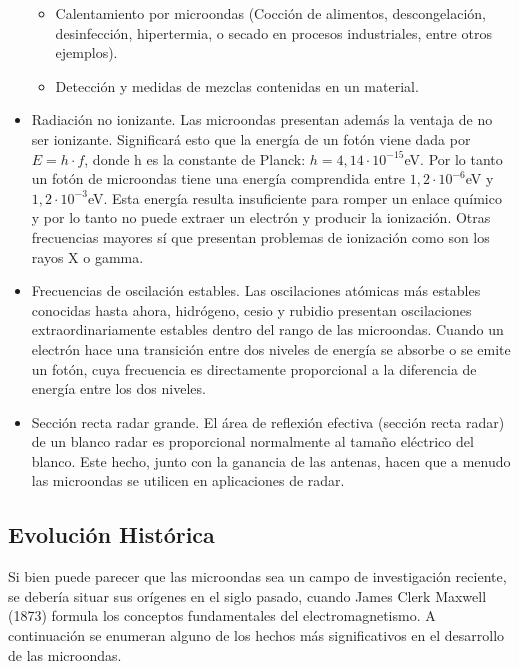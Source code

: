 \documentclass[12pt]{article}
\begin{document}
\begin{itemize}
		\begin{itemize}
			\item Calentamiento por microondas (Cocci\'on de alimentos, descongelaci\'on, desinfecci\'on, hipertermia, o secado en procesos industriales, entre otros ejemplos).
			\item Detecci\'on y medidas de mezclas contenidas en un material.
		\end{itemize}
	\item Radiaci\'on no ionizante. Las microondas presentan adem\'as la ventaja de no ser ionizante. Significar\'a esto que la energ\'ia de un fot\'on viene dada por $E=h\cdot f$, donde h es la constante de Planck: $h= 4,14\cdot 10^{-15}$eV. Por lo tanto un fot\'on de microondas tiene una energ\'ia comprendida entre $1,2\cdot 10^{-6}$eV y $1,2\cdot 10^{-3}$eV. Esta energ\'ia resulta insuficiente para romper un enlace qu\'imico y por lo tanto no puede extraer un electr\'on y producir la ionizaci\'on. Otras frecuencias mayores s\'i que presentan problemas de ionizaci\'on como son los rayos X o gamma.
	\item Frecuencias de oscilaci\'on estables. Las oscilaciones at\'omicas m\'as estables conocidas hasta ahora, hidr\'ogeno, cesio y rubidio presentan oscilaciones extraordinariamente estables dentro del rango de las microondas. Cuando un electr\'on hace una transici\'on entre dos niveles de energ\'ia se absorbe o se emite un fot\'on, cuya frecuencia es directamente proporcional a la diferencia de energ\'ia entre los dos niveles.
	\item Secci\'on recta radar grande. El \'area de reflexi\'on efectiva (secci\'on recta radar) de un blanco radar es proporcional normalmente al tama\~no el\'ectrico del blanco. Este hecho, junto con la ganancia de las antenas, hacen que a menudo las microondas se utilicen en aplicaciones de radar.
\end{itemize}

\subsection{Evoluci\'on Hist\'orica}
Si bien puede parecer que las microondas sea un campo de investigaci\'on reciente, se deber\'ia situar sus or\'igenes en el siglo pasado, cuando James Clerk Maxwell (1873) formula los conceptos fundamentales del electromagnetismo. A continuaci\'on se enumeran alguno de los hechos m\'as significativos en el desarrollo de las microondas.
\end{document}
